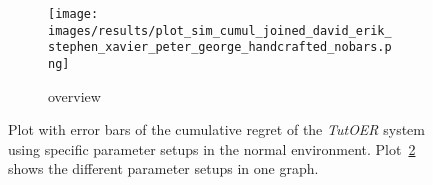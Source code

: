 \begin{figure}[ht]
\begin{subfigure}{0.48\linewidth}
	\label{fig:cumul_handcrafted_peter}
	\end{subfigure}
	\begin{subfigure}{\linewidth}
	\texttt{[image: images/results/plot\_sim\_cumul\_joined\_david\_erik\_stephen\_xavier\_peter\_george\_handcrafted\_nobars.png]}
	\caption{overview}
	\label{fig:cumul_handcrafted_overview_group1}
	\end{subfigure}
	\caption[Cumulative regret in normal simulated environment for group 1]{Plot with error bars of the cumulative regret of the \emph{TutOER}
	system using specific parameter setups in the normal environment.
	Plot~\ref{fig:cumul_handcrafted_overview_group1} shows the
	different parameter setups in one graph.}
	\label{fig:cumul_handcrafted_container_group1}
\end{figure}


